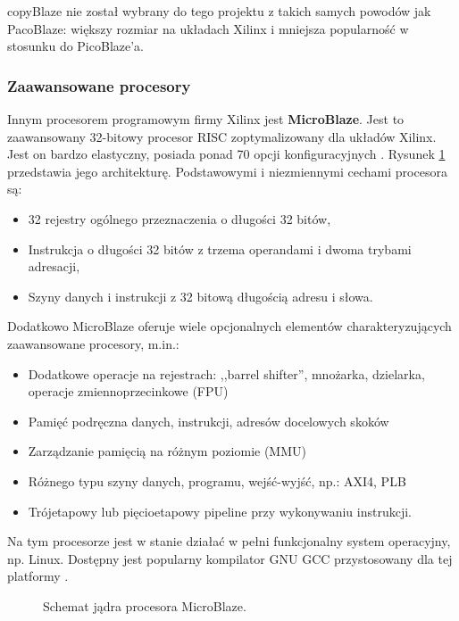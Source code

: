 copyBlaze nie został wybrany do tego projektu z takich samych powodów jak PacoBlaze: większy rozmiar na układach Xilinx i mniejsza popularność w stosunku do PicoBlaze'a.


\subsubsection{Zaawansowane procesory}


Innym procesorem programowym firmy Xilinx jest \textbf{MicroBlaze}. Jest to zaawansowany 32-bitowy procesor RISC zoptymalizowany dla układów Xilinx. Jest on bardzo elastyczny, posiada ponad 70 opcji konfiguracyjnych \cite{MicroBlaze_Ref}. Rysunek \ref{MicroBlaze} przedstawia jego architekturę. Podstawowymi i niezmiennymi cechami procesora są:

\begin{itemize}
	\item		32 rejestry ogólnego przeznaczenia o długości 32 bitów,
	\item		Instrukcja o długości 32 bitów z trzema operandami i dwoma trybami adresacji,
	\item		Szyny danych i instrukcji z 32 bitową długością adresu i słowa.
\end{itemize}

Dodatkowo MicroBlaze oferuje wiele opcjonalnych elementów charakteryzujących zaawansowane procesory, m.in.:

\begin{itemize}
	\item		Dodatkowe operacje na rejestrach: ,,barrel shifter'', mnożarka, dzielarka, operacje zmiennoprzecinkowe (FPU)
	\item		Pamięć podręczna danych, instrukcji, adresów docelowych skoków
	\item		Zarządzanie pamięcią na różnym poziomie (MMU)
	\item		Różnego typu szyny danych, programu, wejść-wyjść, np.: AXI4, PLB
	\item		Trójetapowy lub pięcioetapowy pipeline przy wykonywaniu instrukcji.
\end{itemize}


Na tym procesorze jest w stanie działać w pełni funkcjonalny system operacyjny, np. Linux. Dostępny jest popularny kompilator GNU GCC przystosowany dla tej platformy \cite{MicroBlaze_Ref}.


\begin{figure}[htb]
	\centering
	\caption{ Schemat jądra procesora MicroBlaze. \cite{MicroBlaze_Ref} }
	\label{MicroBlaze}
\end{figure}


